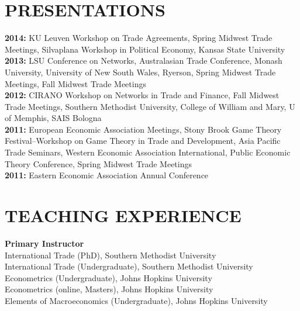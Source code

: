 \documentclass[11pt]{res}
\begin{document}
\begin{resume}
\section{PRESENTATIONS}\vspace{2mm}
{\bf 2014:} KU Leuven Workshop on Trade Agreements, Spring Midwest Trade Meetings, Silvaplana Workshop in Political Economy, Kansas State University\vspace{2mm}\\
{\bf 2013:} LSU Conference on Networks, Australasian Trade Conference, Monash University, University of New South Wales, Ryerson, Spring Midwest Trade Meetings, Fall Midwest Trade Meetings\vspace{2mm}\\
{\bf 2012:}  CIRANO Workshop on Networks in Trade and Finance, Fall Midwest Trade Meetings, Southern Methodist University, College of William and Mary, U of Memphis, SAIS Bologna\vspace{2mm}\\
{\bf 2011:} European Economic Association Meetings, Stony Brook Game Theory Festival--Workshop on Game Theory in Trade and Development, Asia Pacific Trade Seminars, Western Economic Association International, Public Economic Theory Conference, Spring Midwest Trade Meetings\vspace{2mm}\\
 {\bf 2011:} Eastern Economic Association Annual Conference \vspace{2mm}\\

\newpage
\phantom{.}\vspace{.4cm}

\section{TEACHING EXPERIENCE} \vspace{3mm}
{\bf Primary Instructor}\vspace{2mm}\\
International Trade (PhD), Southern Methodist University\vspace{1.5mm}\\
International Trade (Undergraduate), Southern Methodist University\vspace{1.5mm}\\
Econometrics (Undergraduate), Johns Hopkins University\vspace{1.5mm}\\
Econometrics (online, Masters), Johns Hopkins University\vspace{1.5mm}\\
Elements of Macroeconomics (Undergraduate), Johns Hopkins University\vspace{1.5mm}\\


\end{resume}
\end{document}
